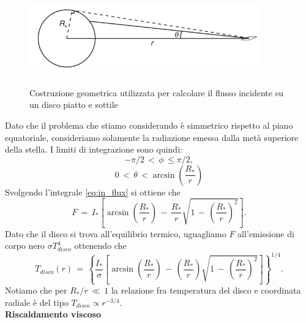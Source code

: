 \begin{figure}[H]
    \centering
    \includegraphics[height=4cm, width=10cm]{Immagini/IntroTeorica/Temp_Pass.png}
    \caption{Costruzione geometrica utilizzata per calcolare il flusso incidente su un disco piatto e sottile \parencite{Dispense}}
    \label{fig:temp_pass}
\end{figure}
Dato che il problema che stiamo considerando è simmetrico rispetto al piano equatoriale, consideriamo solamente la radiazione emessa dalla metà superiore della stella. I limiti di integrazione sono quindi:
\begin{equation}
-\pi/2\,<\,\phi\,\leq\pi/2,
\label{eq:flux_lim_phi}
\end{equation}
\begin{equation}
0\,<\,\theta\,<\arcsin{\left(\frac{R_\ast}{r}\right)}
\label{eq:flux_lim_phi}
\end{equation}
Svolgendo l'integrale \eqref{eq:in_flux} si ottiene che
\begin{equation}
F\,=\,I_\ast\left[\arcsin{\left(\frac{R_\ast}{r}\right)}\,-\,\frac{R_\ast}{r}\sqrt{1\,-\,\left(\frac{R_\ast}{r}\right)^2}\right].
\label{eq:ex_flux}
\end{equation}
Dato che il disco si trova all'equilibrio termico, uguagliamo $F$ all'emissione di corpo nero $\sigma T_{disco}^4$ ottenendo che
\begin{equation}
T_{disco}\left(r\right)\,=\, \left\{\frac{I_\ast}{\sigma}\left[\arcsin{\left(\frac{R_\ast}{r}\right)}\,-\,\left(\frac{R_\ast}{r}\right)\sqrt{1\,-\,\left(\frac{R_\ast}{r}\right)^2}\right]\right\}^{1/4}.
\label{eq:radial_prof}
\end{equation}
Notiamo che per $R_\ast/r\,\ll\,1$ la relazione fra temperatura del disco e coordinata radiale è del tipo $T_{disco}\propto r^{-3/4}$.\\

\textbf{Riscaldamento viscoso}\\

